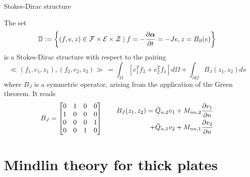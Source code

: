 \documentclass{beamer}
\begin{document}
\begin{frame}{Stokes-Dirac structure}
 \begin{theorem}
	The set
	\begin{equation*}
	\mathbb{D} := \left\{ (f,e,z) \in \mathcal{F}\times\mathcal{E}\times\mathcal{Z} \; | \; f= - \diffp{\bm{\alpha}}{t} = -Je, z= B_{\partial}(e) \right\}
	\end{equation*} 
	is a Stokes-Dirac structure with respect to the pairing
	\begin{equation*}
	\ll (f_1, e_1, z_1), (f_2, e_2, z_2) \gg  \,= \int_{\Omega} \left[ e_1^T f_2 + e_2^T f_1 \right] d\Omega  + \int_{\partial \Omega} B_J(z_1, z_2) ds
	\end{equation*}
	where $B_J$ is a symmetric operator, arising from the application of the Green theorem. It reads
	\begin{equation*}
	B_J = 
	\begin{bmatrix}
	0 & 1 & 0 & 0 \\
	1 & 0 & 0 & 0 \\
	0 & 0 & 0 & 1 \\
	0 & 0 & 1 & 0 \\ 
	\end{bmatrix} \qquad
	\begin{aligned}
	B_J(z_1,z_2)= \tilde{Q}_{n,2} v_1 + M_{nn, 2} \diffp{v_1}{n} \\
	+ \tilde{Q}_{n,1} v_2 + M_{nn, 1} \diffp{v_2}{n}
	\end{aligned}
	\end{equation*}
\end{theorem}

\end{frame}

\section{Mindlin theory for thick plates}
\end{document}
